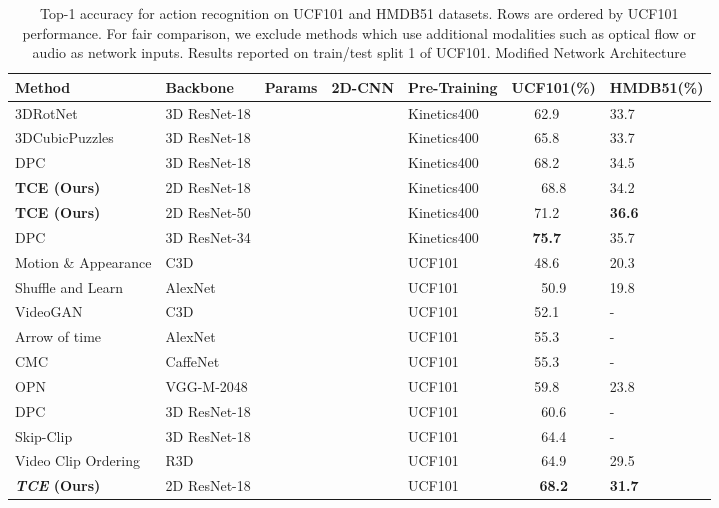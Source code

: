 \documentclass[a4paper,conference]{IEEEtran}
\newcommand{\cmark}{\ding{51}}
\newcommand{\xmark}{\ding{55}}
\begin{document}
    
    


\begin{table*}[t]
    \centering
        \caption{Top-1 accuracy for action recognition on UCF101 and HMDB51 datasets. Rows are ordered by UCF101 performance.  For fair comparison, we exclude methods which use additional modalities such as optical flow or audio as network inputs. Results reported on train/test split 1 of UCF101. Modified Network Architecture}
        \begin{tabular}{lllclcl}
        \hline \hline 
         Method & Backbone & Params & 2D-CNN & Pre-Training & UCF101(\%) & HMDB51(\%)\\
         \hline \hline 
3DRotNet \cite{jing2018selfsupervised} & 3D ResNet-18 & & \xmark & Kinetics400 & 62.9~~  & 33.7 \\
         3DCubicPuzzles \cite{kim2019self} & 3D ResNet-18 & & \xmark & Kinetics400 & 65.8~~ & 33.7 \\
         DPC \cite{han2019video} & 3D ResNet-18 & & \xmark & Kinetics400 & 68.2~~ & 34.5 \\
         \textbf{TCE (Ours)} & 2D ResNet-18 &  & \cmark & Kinetics400 & 68.8 & 34.2 \\ \textbf{TCE (Ours)} & 2D ResNet-50 &  & \cmark & Kinetics400 & 71.2~~ & \textbf{36.6} \\ DPC \cite{han2019video} & 3D ResNet-34 & & \xmark & Kinetics400 & \textbf{75.7}~~ & 35.7 \\
         \hline
         Motion \& Appearance \cite{wang2019selfsupervised}& C3D & & \xmark & UCF101 & 48.6~~  & 20.3 \\
         Shuffle and Learn \cite{misra2016shuffle} & AlexNet & & \cmark & UCF101 & 50.9 & 19.8 \\
         VideoGAN \cite{vondrick2016generating} & C3D & & \xmark & UCF101 & 52.1~~ & - \\
         Arrow of time \cite{wei2018learning}& AlexNet & & \cmark & UCF101 & 55.3~~ & - \\
         CMC \cite{tian2019contrastive} & CaffeNet  & & \cmark & UCF101 & 55.3~~ & - \\
         OPN \cite{lee2017unsupervised} &  VGG-M-2048 & & \cmark & UCF101 & 59.8~~ & 23.8\\
         
         
DPC \cite{han2019video} & 3D ResNet-18 & & \xmark & UCF101 & 60.6 & - \\
         Skip-Clip \cite{el2019skip} & 3D ResNet-18 & & \xmark & UCF101  & 64.4 & - \\ Video Clip Ordering \cite{xu2019self} & R3D &  & \xmark & UCF101 & 64.9 & 29.5 \\
         \textbf{\textit{TCE} (Ours)} & 2D ResNet-18 &  & \cmark & UCF101 & \textbf{68.2} & \textbf{31.7}\\
         \hline 
        \end{tabular}
    \label{tab:soa_table}
\end{table*}
\end{document}
